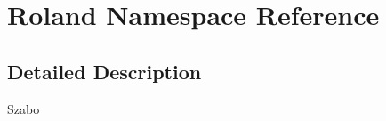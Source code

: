 \hypertarget{namespace_roland}{
\section{Roland Namespace Reference}
\label{namespace_roland}
}


\subsection{Detailed Description}
Szabo 